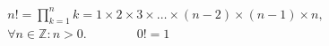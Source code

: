 \begin{multicols}{2}

    \begin{CheatsheetEntryFrame}

        \begin{gather*}
            n!
            = \prod_{k = 1}^n{k}
            = 1 \times 2 \times 3 \times \dots \times (n-2) \times (n-1) \times n,
            \\
            \forall n \in \mathbb{Z} : n > 0.
            \qquad\qquad
            0! = 1
        \end{gather*}

    \end{CheatsheetEntryFrame}

    \begin{CheatsheetEntryFrame}


        \renewcommand{\W}{\displaystyle} %
        \newcommand{\X}{\displaystyle \vphantom{\parens*{\sqrt[\frac{I}{I}]{I}}}} %
        \newcommand{\Y}{\displaystyle \vphantom{\frac{I}{I}}} %
        \newcommand{\Z}{\displaystyle \vphantom{\parens*{\parens*{\frac{I}{I}}^I}}} %



\end{CheatsheetEntryFrame}
\end{multicols}
